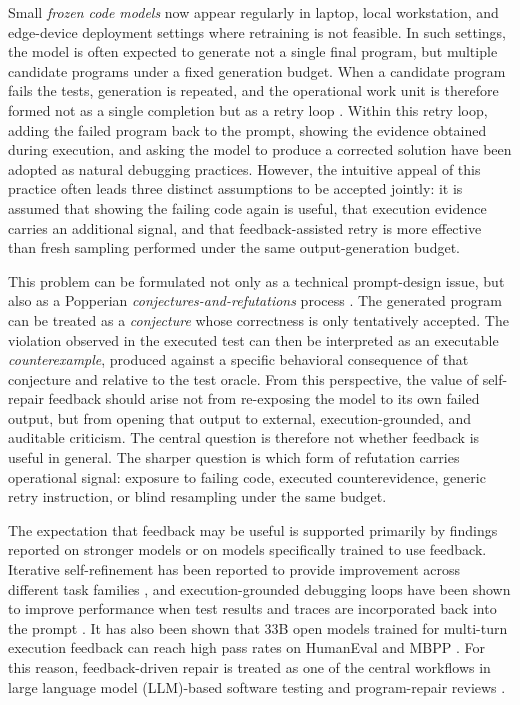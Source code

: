 \documentclass{article}
\numberwithin{equation}{section}  %
\theoremstyle{definition}
\begin{document}
Small \emph{frozen code models} now appear regularly in laptop, local workstation,
and edge-device deployment settings where retraining is not feasible. In such settings, the
model is often expected to generate not a single final program, but multiple candidate programs
under a fixed generation budget. When a candidate program fails the tests, generation is repeated,
and the operational work unit is therefore formed not as a single completion but as a retry loop
\citep{wang2024software,zubair2025repair}. Within this retry loop, adding the failed program back
to the prompt, showing the evidence obtained during execution, and asking the model to produce a
corrected solution have been adopted as natural debugging practices. However, the intuitive appeal
of this practice often leads three distinct assumptions to be accepted jointly: it is assumed that
showing the failing code again is useful, that execution evidence carries an additional signal, and
that feedback-assisted retry is more effective than fresh sampling performed under the same
output-generation budget.

This problem can be formulated not only as a technical prompt-design issue, but also as a
Popperian \emph{conjectures-and-refutations} process
\citep{popper1959logic,popper1963conjectures}. The generated program can be treated as a
\emph{conjecture} whose correctness is only tentatively accepted. The violation observed in the
executed test can then be interpreted as an executable \emph{counterexample}, produced against a
specific behavioral consequence of that conjecture and relative to the test oracle. From this
perspective, the value of self-repair feedback should arise not from re-exposing the model to its
own failed output, but from opening that output to external, execution-grounded, and auditable
criticism. The central question is therefore not whether feedback is useful in general. The sharper
question is which form of refutation carries operational signal: exposure to failing code, executed
counterevidence, generic retry instruction, or blind resampling under the same budget.

The expectation that feedback may be useful is supported primarily by findings reported on stronger
models or on models specifically trained to use feedback. Iterative self-refinement has been reported
to provide improvement across different task families \citep{madaan2023selfrefine,shinn2023reflexion},
and execution-grounded debugging loops have been shown to improve performance when test results and
traces are incorporated back into the prompt \citep{chen2024selfdebug,zhong2024ldb}. It has also
been shown that 33B open models trained for multi-turn execution feedback can reach high pass rates
on HumanEval and MBPP \citep{zheng2024opencodeinterpreter}. For this reason, feedback-driven repair
is treated as one of the central workflows in large language model (LLM)-based software testing and
program-repair reviews \citep{wang2024software,zubair2025repair,takallou2026llms}.
\end{document}
